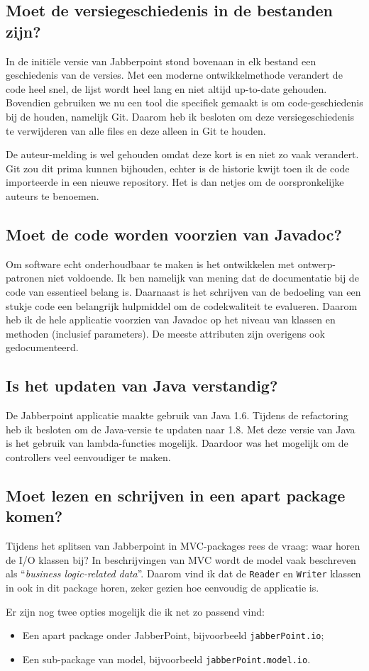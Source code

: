 \documentclass[a4paper]{article}
\newcommand{\question}[1]{
  \subsection{#1}
}
\newcommand{\code}[1]{\lstinline[columns=fixed]{#1}}
\begin{document}
    \question{Moet de versiegeschiedenis in de bestanden zijn?}
		In de initiële versie van Jabberpoint stond bovenaan in elk bestand een geschiedenis van de versies.
		Met een moderne ontwikkelmethode verandert de code heel snel, de lijst wordt heel lang en niet altijd up-to-date gehouden.
		Bovendien gebruiken we nu een tool die specifiek gemaakt is om code-geschiedenis bij de houden, namelijk Git.
		Daarom heb ik besloten om deze versiegeschiedenis te verwijderen van alle files en deze alleen in Git te houden.

		De auteur-melding is wel gehouden omdat deze kort is en niet zo vaak verandert.
		Git zou dit prima kunnen bijhouden, echter is de historie kwijt toen ik de code importeerde in een nieuwe repository.
		Het is dan netjes om de oorspronkelijke auteurs te benoemen.

    \question{Moet de code worden voorzien van Javadoc?}
		Om software echt onderhoudbaar te maken is het ontwikkelen met ontwerp-patronen niet voldoende.
		Ik ben namelijk van mening dat de documentatie bij de code van essentieel belang is.
		Daarnaast is het schrijven van de bedoeling van een stukje code een belangrijk hulpmiddel om de codekwaliteit te evalueren.
		Daarom heb ik de hele applicatie voorzien van Javadoc op het niveau van klassen en methoden (inclusief parameters).
		De meeste attributen zijn overigens ook gedocumenteerd.

	\question{Is het updaten van Java verstandig?}
		De Jabberpoint applicatie maakte gebruik van Java 1.6.
		Tijdens de refactoring heb ik besloten om de Java-versie te updaten naar 1.8.
		Met deze versie van Java is het gebruik van lambda-functies mogelijk.
		Daardoor was het mogelijk om de controllers veel eenvoudiger te maken.

	\question{Moet lezen en schrijven in een apart package komen?}
		Tijdens het splitsen van Jabberpoint in MVC-packages rees de vraag: waar horen de I/O klassen bij?
		In beschrijvingen van MVC wordt de model vaak beschreven als ``\textit{business logic-related data}''.
		Daarom vind ik dat de \code{Reader} en \code{Writer} klassen in ook in dit package horen, zeker gezien hoe eenvoudig de applicatie is.

		Er zijn nog twee opties mogelijk die ik net zo passend vind:
		\begin{itemize}
			\item Een apart package onder JabberPoint, bijvoorbeeld \code{jabberPoint.io};
			\item Een sub-package van model, bijvoorbeeld \code{jabberPoint.model.io}.
		\end{itemize}
\end{document}
